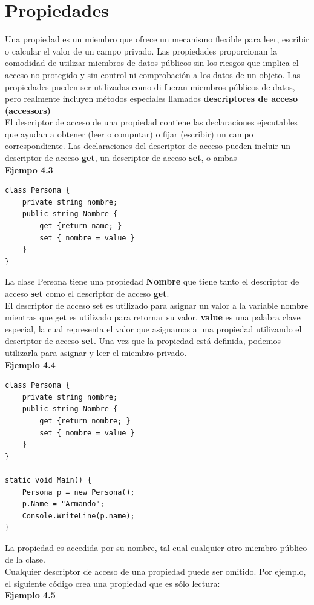 \documentclass[12pt,a4paper]{report}
\begin{document}
\section{Propiedades}
Una propiedad es un miembro que ofrece un mecanismo flexible para leer, escribir o calcular el valor de un campo privado. Las propiedades proporcionan la comodidad de utilizar miembros de datos públicos sin los riesgos que implica el acceso no protegido y sin control ni comprobación a los datos de un objeto. Las propiedades pueden ser utilizadas como di fueran miembros públicos de datos, pero realmente incluyen métodos especiales llamados \textbf{descriptores de acceso (accessors)}\\El descriptor de acceso de una propiedad contiene las declaraciones ejecutables que ayudan a obtener (leer o computar) o fijar (escribir) un campo correspondiente. Las declaraciones del descriptor de acceso pueden incluir un descriptor de acceso \textbf{get}, un descriptor de acceso \textbf{set}, o ambas \\\textbf{Ejempo 4.3}
\begin{lstlisting}
class Persona {
	private string nombre;
	public string Nombre {
		get {return name; }
		set { nombre = value }	
	}
}
\end{lstlisting} La clase Persona tiene una propiedad \textbf{Nombre} que tiene tanto el descriptor de acceso \textbf{set} como el descriptor de acceso \textbf{get}.\\El descriptor de acceso set es utilizado para asignar un valor a la variable nombre mientras que get es utilizado para retornar su valor. \textbf{value} es una palabra clave especial, la cual representa el valor que asignamos a una propiedad utilizando el descriptor de acceso \textbf{set}. Una vez que la propiedad está definida, podemos utilizarla para asignar y leer el miembro privado.\\\textbf{Ejemplo 4.4 }
\begin{lstlisting}
class Persona {
	private string nombre;
	public string Nombre {
		get {return nombre; }
		set { nombre = value }	
	}
}

static void Main() {
	Persona p = new Persona();
	p.Name = "Armando";
	Console.WriteLine(p.name);
}
\end{lstlisting} La propiedad es accedida por su nombre, tal cual cualquier otro miembro público de la clase.\\Cualquier descriptor de acceso de una propiedad puede ser omitido. Por ejemplo, el siguiente código crea una propiedad que es sólo lectura: \\\textbf{Ejemplo 4.5}
\end{document}
